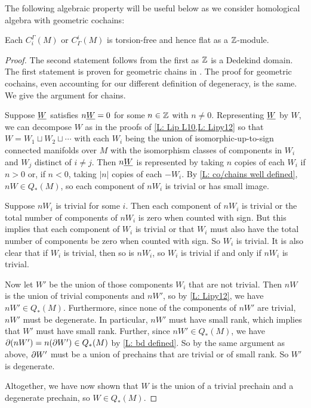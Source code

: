 The following algebraic property will be useful below as we consider homological algebra with geometric cochains:

\begin{lemma}
	Each $C_i^\Gamma(M)$ or $C_\Gamma^i(M)$ is torsion-free and hence flat as a $\mathbb{Z}$-module.
\end{lemma}

\begin{proof}
	The second statement follows from the first as $\mathbb{Z}$ is a Dedekind domain.
	The first statement is proven for geometric chains in \cite[Lemma 34]{Lipy14}.
	The proof for geometric cochains, even accounting for our different definition of degeneracy, is the same.
	We give the argument for chains.

	Suppose $\underline{W}$ satisfies $n \underline{W} = 0$ for some $n \in \mathbb{Z}$ with $n \neq 0$.
	Representing $\underline{W}$ by $W$, we can decompose $W$ as in the proofs of \cref{L: Lip L10,L: Lipy12} so that $W = W_1 \sqcup W_2 \sqcup \cdots$ with each $W_i$ being the union of isomorphic-up-to-sign connected manifolds over $M$ with the isomorphism classes of components in $W_i$ and $W_j$ distinct of $i\neq j$.
	Then $n \underline{W}$ is represented by taking $n$ copies of each $W_i$ if $n > 0$ or, if $n < 0$, taking $|n|$ copies of each $-W_i$.
	By \cref{L: co/chains well defined}, $n W \in Q_*(M)$, so each component of $n W_i$ is trivial or has small image.

	Suppose  $n W_i$ is trivial for some $i$.
 	Then each component of $n W_i$ is trivial or the total number of components of $n W_i$ is zero when counted with sign.
	But this implies that each component of $W_i$ is trivial or that $W_i$ must also have the total number of components be zero when counted with sign.
	So $W_i$ is trivial.
	It is also clear that if $W_i$ is trivial, then so is $n W_i$, so $W_i$ is trivial if and only if $n W_i$ is trivial.

	Now let $W'$ be the union of those components $W_i$ that are not trivial.
	Then $nW$ is the union of trivial components and $n W'$, so by \cref{L: Lipy12}, we have $n W' \in Q_*(M)$.
	Furthermore, since none of the components of $n W'$ are trivial, $n W'$ must be degenerate.
	In particular, $n W'$ must have small rank, which implies that $W'$ must have small rank.
	Further, since $n W' \in Q_*(M)$, we have $\partial (n W') = n (\partial W') \in Q_*(M)$ by \cref{L: bd defined}.
	So by the same argument as above, $\partial W'$ must be a union of prechains that are trivial or of small rank.
	So $W'$ is degenerate.

	Altogether, we have now shown that $W$ is the union of a trivial prechain and a degenerate prechain, so $W \in Q_*(M)$.
\end{proof}

